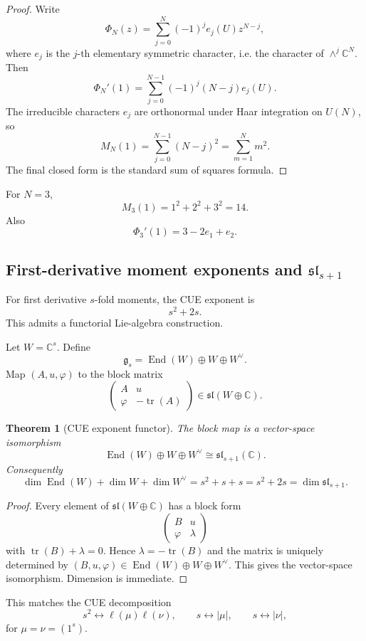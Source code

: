 \documentclass[11pt]{amsart}
\newtheorem{theorem}{Theorem}[section]
\DeclareMathOperator{\End}{End}
\DeclareMathOperator{\tr}{tr}
\newcommand{\CC}{\mathbb C}
\begin{document}
\begin{proof}
Write
\[
       \Phi_N(z)=\sum_{j=0}^N(-1)^j e_j(U)z^{N-j},
\]
where $e_j$ is the $j$-th elementary symmetric character, i.e. the character of $\wedge^j\CC^N$.  Then
\[
       \Phi_N'(1)=\sum_{j=0}^{N-1}(-1)^j(N-j)e_j(U).
\]
The irreducible characters $e_j$ are orthonormal under Haar integration on $U(N)$, so
\[
       M_N(1)=\sum_{j=0}^{N-1}(N-j)^2=\sum_{m=1}^N m^2.
\]
The final closed form is the standard sum of squares formula.\end{proof}

For $N=3$,
\[
       M_3(1)=1^2+2^2+3^2=14.
\]
Also
\[
       \Phi_3'(1)=3-2e_1+e_2.
\]

\subsection{First-derivative moment exponents and $\mathfrak{sl}_{s+1}$}

For first derivative $s$-fold moments, the CUE exponent is
\[
       s^2+2s.
\]
This admits a functorial Lie-algebra construction.

Let $W=\CC^s$.  Define
\[
       \mathfrak g_s=\End(W)\oplus W\oplus W^\vee.
\]
Map $(A,u,\varphi)$ to the block matrix
\[
       \begin{pmatrix}
       A & u\\
       \varphi & -\tr(A)
       \end{pmatrix}
       \in\mathfrak{sl}(W\oplus\CC).
\]

\begin{theorem}[CUE exponent functor]
The block map is a vector-space isomorphism
\[
       \End(W)\oplus W\oplus W^\vee
       \cong
       \mathfrak{sl}_{s+1}(\CC).
\]
Consequently
\[
       \dim\End(W)+\dim W+\dim W^\vee=s^2+s+s=s^2+2s=\dim\mathfrak{sl}_{s+1}.
\]
\end{theorem}

\begin{proof}
Every element of $\mathfrak{sl}(W\oplus\CC)$ has a block form
\[
       \begin{pmatrix}B&u\\ \varphi&\lambda\end{pmatrix}
\]
with $\tr(B)+\lambda=0$.  Hence $\lambda=-\tr(B)$ and the matrix is uniquely determined by $(B,u,\varphi)\in\End(W)\oplus W\oplus W^\vee$.  This gives the vector-space isomorphism.  Dimension is immediate.\end{proof}

This matches the CUE decomposition
\[
       s^2 \leftrightarrow \ell(\mu)\ell(\nu),
       \qquad
       s\leftrightarrow |\mu|,
       \qquad
       s\leftrightarrow |\nu|,
\]
for $\mu=\nu=(1^s)$.
\end{document}
